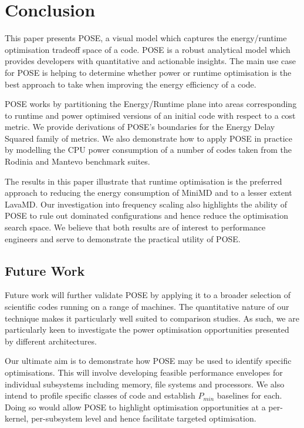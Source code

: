 \section{Conclusion}
\label{sec:conclusion}
This paper presents POSE, a visual model which captures the energy/runtime optimisation tradeoff space of a code.
POSE is a robust analytical model which provides developers with quantitative and actionable insights.
The main use case for POSE is helping to determine whether power or runtime optimisation is the best approach to take when improving the energy efficiency of a code.

POSE works by partitioning the Energy/Runtime plane into areas corresponding to runtime and power optimised versions of an initial code with respect to a cost metric.
We provide derivations of POSE's boundaries for the Energy Delay Squared family of metrics.
We also demonstrate how to apply POSE in practice by modelling the CPU power consumption of a number of codes taken from the Rodinia and Mantevo benchmark suites.  

The results in this paper illustrate that runtime optimisation is the preferred approach to reducing the energy consumption of MiniMD and to a lesser extent LavaMD.
Our investigation into frequency scaling also highlights the ability of POSE to rule out dominated configurations and hence reduce the optimisation search space.
We believe that both results are of interest to performance engineers and serve to demonstrate the practical utility of POSE.

\subsection{Future Work}
Future work will further validate POSE by applying it to a broader selection of scientific codes running on a range of machines.
The quantitative nature of our technique makes it particularly well suited to comparison studies.
As such, we are particularly keen to investigate the power optimisation opportunities presented by different architectures.

Our ultimate aim is to demonstrate how POSE may be used to identify specific optimisations.
This will involve developing feasible performance envelopes for individual subsystems including memory, file systems and processors. 
We also intend to profile specific classes of code and establish $P_{min}$ baselines for each.
Doing so would allow POSE to highlight optimisation opportunities at a per-kernel, per-subsystem level and hence facilitate targeted optimisation.
